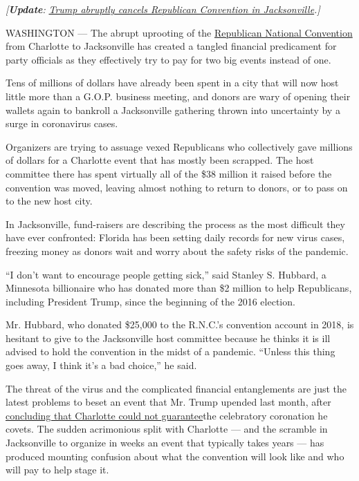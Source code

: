 \emph{{[}\textbf{\textbf{Update}}:}
\href{https://www.nytimes.com/2020/07/23/us/politics/jacksonville-rnc.html}{\emph{Trump
abruptly cancels Republican Convention in Jacksonville}}\emph{.{]}}

WASHINGTON --- The abrupt uprooting of the
\href{https://www.nytimes.com/2020/07/14/us/politics/republican-convention-jacksonville-virus-outdoors.html}{Republican
National Convention} from Charlotte to Jacksonville has created a
tangled financial predicament for party officials as they effectively
try to pay for two big events instead of one.

Tens of millions of dollars have already been spent in a city that will
now host little more than a G.O.P. business meeting, and donors are wary
of opening their wallets again to bankroll a Jacksonville gathering
thrown into uncertainty by a surge in coronavirus cases.

Organizers are trying to assuage vexed Republicans who collectively gave
millions of dollars for a Charlotte event that has mostly been scrapped.
The host committee there has spent virtually all of the \$38 million it
raised before the convention was moved, leaving almost nothing to return
to donors, or to pass on to the new host city.

In Jacksonville, fund-raisers are describing the process as the most
difficult they have ever confronted: Florida has been setting daily
records for new virus cases, freezing money as donors wait and worry
about the safety risks of the pandemic.

``I don't want to encourage people getting sick,'' said Stanley S.
Hubbard, a Minnesota billionaire who has donated more than \$2 million
to help Republicans, including President Trump, since the beginning of
the 2016 election.

Mr. Hubbard, who donated \$25,000 to the R.N.C.'s convention account in
2018, is hesitant to give to the Jacksonville host committee because he
thinks it is ill advised to hold the convention in the midst of a
pandemic. ``Unless this thing goes away, I think it's a bad choice,'' he
said.

The threat of the virus and the complicated financial entanglements are
just the latest problems to beset an event that Mr. Trump upended last
month, after
\href{https://www.nytimes.com/2020/06/10/us/politics/republican-national-convention-jacksonville-florida.html}{concluding
that Charlotte could not guarantee}the celebratory coronation he covets.
The sudden acrimonious split with Charlotte --- and the scramble in
Jacksonville to organize in weeks an event that typically takes years
--- has produced mounting confusion about what the convention will look
like and who will pay to help stage it.

